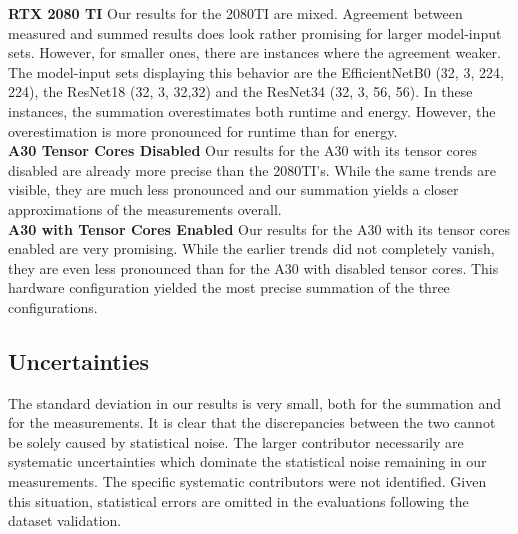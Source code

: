 \textbf{RTX 2080 TI} Our results for the 2080TI are mixed. Agreement between measured and summed results does look rather promising for larger model-input sets. However, for smaller ones, there are instances where the agreement weaker. The model-input sets displaying this behavior are the EfficientNetB0 (32, 3, 224, 224), the ResNet18 (32, 3, 32,32) and the ResNet34 (32, 3, 56, 56). In these instances, the summation overestimates both runtime and energy. However, the overestimation is more pronounced for runtime than for energy. \\
\textbf{A30 Tensor Cores Disabled} Our results for the A30 with its tensor cores disabled are already more precise than the 2080TI's. While the same trends are visible, they are much less pronounced and our summation yields a closer approximations of the measurements overall. \\
\textbf{A30 with Tensor Cores Enabled} Our results for the A30 with its tensor cores enabled are very promising. While the earlier trends did not completely vanish, they are even less pronounced than for the A30 with disabled tensor cores. This hardware configuration yielded the most precise summation of the three configurations.



\subsection{Uncertainties}
 The standard deviation in our results is very small, both for the summation and for the measurements. It is clear that the discrepancies between the two cannot be solely caused by statistical noise. The larger contributor necessarily are systematic uncertainties which dominate the statistical noise remaining in our measurements. The specific systematic contributors were not identified. Given this situation, statistical errors are omitted in the evaluations following the dataset validation.

\setcounter{savedpage}{\value{page}}






\setcounter{page}{\numexpr\value{savedpage}+3\relax}


